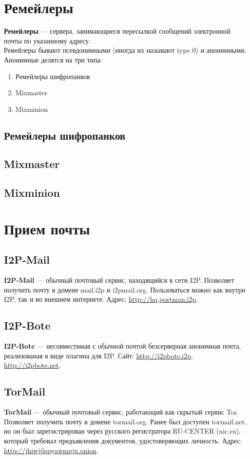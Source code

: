 \section{Ремейлеры}
\textbf{Ремейлеры} --- сервера, занимающиеся пересылкой сообщений электронной почты по указанному адресу.\\
Ремейлеры бывают псевдонимными (иногда их называют type 0) и анонимными. Анонимные делятся на три типа:
\begin{enumerate}
\item Ремейлеры шифропанков
\item Mixmaster 
\item Mixminion
\end{enumerate}
\subsection{Ремейлеры шифропанков}
\subsection{Mixmaster}
\subsection{Mixminion}

\section{Прием почты}
\subsection{I2P-Mail}
\textbf{I2P-Mail} --- обычный почтовый сервис, находящийся в сети I2P. Позволяет получить почту в домене mail.i2p и i2pmail.org. Пользоваться можно как внутри I2P, так и во внешнем интернете. Адрес: \url{http://hq.postman.i2p}.
\subsection{I2P-Bote}
\textbf{I2P-Bote} --- несовместимая с обычной почтой безсерверная анонимная почта, реализованая в виде плагина для I2P. Сайт: \url{http://i2pbote.i2p}, \url{http://i2pbote.net}.
\subsection{TorMail}
\textbf{TorMail} --- обычный почтовый сервис, работающий как скрытый сервис Tor. Позволяет получить почту в домене tormail.org. Ранее был доступен tormail.net, но он был зарегистрирован через русского регистратора RU-CENTER (nic.ru), который требовал предъявления документов, удостоверяющих личность\cite{tormail}. Адрес: \url{http://jhiwjjlqpyawmpjx.onion}.
